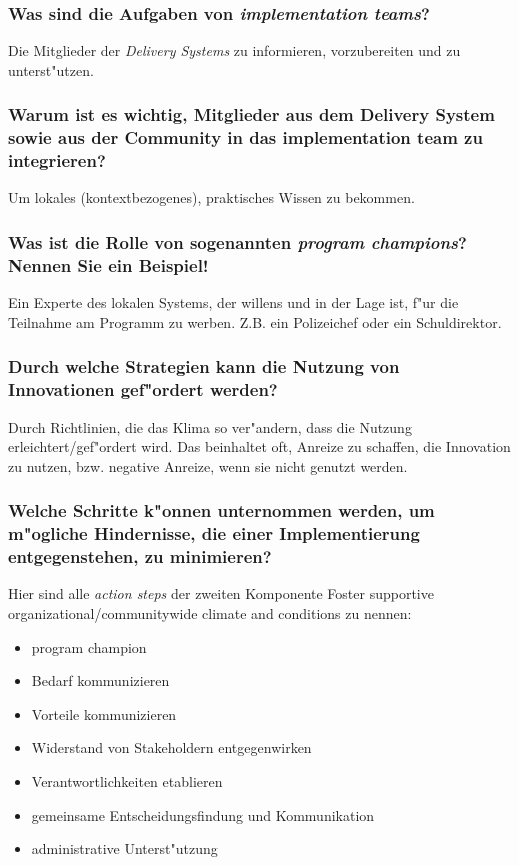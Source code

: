 \subsubsection{Was sind die Aufgaben von \emph{implementation teams}?}
Die Mitglieder der \emph{Delivery Systems} zu informieren, vorzubereiten und zu unterst"utzen.

\subsubsection{Warum ist es wichtig, Mitglieder aus dem Delivery System sowie aus der Community in das implementation team zu integrieren?}
Um lokales (kontextbezogenes), praktisches Wissen zu bekommen.

\subsubsection{Was ist die Rolle von sogenannten \emph{program champions}? Nennen Sie ein Beispiel!}
Ein Experte des lokalen Systems, der willens und in der Lage ist, f"ur die Teilnahme am Programm zu werben. Z.B. ein Polizeichef oder ein Schuldirektor.

\subsubsection{Durch welche Strategien kann die Nutzung von Innovationen gef"ordert werden?}
Durch Richtlinien, die das Klima so ver"andern, dass die Nutzung erleichtert/gef"ordert wird. Das beinhaltet oft, Anreize zu schaffen, die Innovation zu nutzen, bzw. negative Anreize, wenn sie nicht genutzt werden.

\subsubsection{Welche Schritte k"onnen unternommen werden, um m"ogliche Hindernisse, die einer Implementierung entgegenstehen, zu minimieren?}
Hier sind alle \emph{action steps} der zweiten Komponente {Foster supportive organizational/communitywide climate and conditions} zu nennen:
\begin{itemize}
        \item program champion
        \item Bedarf kommunizieren
        \item Vorteile kommunizieren
        \item Widerstand von Stakeholdern entgegenwirken
        \item Verantwortlichkeiten etablieren
        \item gemeinsame Entscheidungsfindung und Kommunikation 
        \item administrative Unterst"utzung
\end{itemize}

